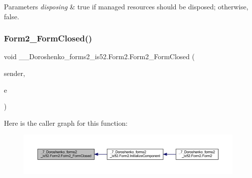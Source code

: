 \begin{DoxyParams}{Parameters}
{\em disposing} & true if managed resources should be disposed; otherwise, false.\\
\hline
\end{DoxyParams}
\hypertarget{class__7___doroshenko__forms2__is52_1_1_form2_a8698e838d5d9734d53fedba59bfd61eb}{}\label{class__7___doroshenko__forms2__is52_1_1_form2_a8698e838d5d9734d53fedba59bfd61eb} 
\subsubsection{\texorpdfstring{Form2\+\_\+\+Form\+Closed()}{Form2\_FormClosed()}}
{\footnotesize\ttfamily void \+\_\+\_\+\+Doroshenko\+\_\+forms2\+\_\+is52.\+Form2.\+Form2\+\_\+\+Form\+Closed (\begin{DoxyParamCaption}\item[{object}]{sender,  }\item[{Form\+Closed\+Event\+Args}]{e }\end{DoxyParamCaption})\hspace{0.3cm}{\ttfamily [private]}}

Here is the caller graph for this function\+:
\nopagebreak
\begin{figure}[H]
\begin{center}
\leavevmode
\includegraphics[width=350pt]{class__7___doroshenko__forms2__is52_1_1_form2_a8698e838d5d9734d53fedba59bfd61eb_icgraph}
\end{center}
\end{figure}
\hypertarget{class__7___doroshenko__forms2__is52_1_1_form2_af5ba83f8108664f707d7e82f0481f13a}{}\label{class__7___doroshenko__forms2__is52_1_1_form2_af5ba83f8108664f707d7e82f0481f13a} 
